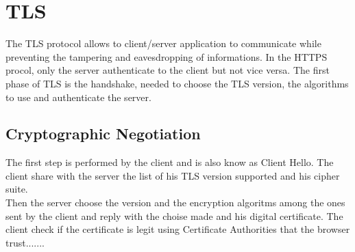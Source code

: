 \section{TLS}
The TLS protocol allows to client/server application to communicate while preventing the tampering and eavesdropping of informations. In the HTTPS procol, only the server authenticate to the client but not vice versa. The first phase of TLS is the handshake, needed to choose the TLS version, the algorithms to use and authenticate the server.
\subsection{Cryptographic Negotiation}
The first step is performed by the client and is also know as Client Hello. The client share with the server the list of his TLS version supported and his cipher suite.\\
Then the server choose the version and the encryption algoritms among the ones sent by the client and reply with the choise made and his digital certificate.
The client check if the certificate is legit using Certificate Authorities that the browser trust.......%
